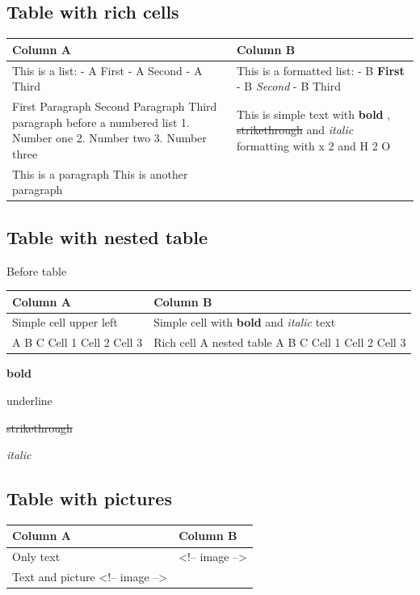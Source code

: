 \documentclass[11pt,a4paper]{article}
\begin{document}
\subsection{Table with rich cells}

\begin{table}[h]
\begin{tabular}{|l|l|}
\hline
Column A & Column B \\ \hline
This is a list:  - A First - A Second - A Third & This is a formatted list:  - B \textbf{First} - B \textit{Second} - B Third \\ \hline
First Paragraph  Second Paragraph  Third paragraph before a numbered list  1. Number one 2. Number two 3. Number three & This is simple text with  \textbf{bold}  ,  \sout{strikethrough}  and  \textit{italic}  formatting with x  2  and H  2  O \\ \hline
This is a paragraph  This is another paragraph &  \\ \hline
\end{tabular}
\end{table}

\subsection{Table with nested table}

Before table

\begin{table}[h]
\begin{tabular}{|l|l|}
\hline
Column A & Column B \\ \hline
Simple cell upper left & Simple cell with  \textbf{bold}  and  \textit{italic}  text \\ \hline
A B C Cell 1 Cell 2 Cell 3 & Rich cell A nested table  A B C Cell 1 Cell 2 Cell 3 \\ \hline
\end{tabular}
\end{table}

\textbf{bold}

underline

\sout{strikethrough}

\textit{italic}

\subsection{Table with pictures}

\begin{table}[h]
\begin{tabular}{|l|l|}
\hline
Column A & Column B \\ \hline
Only text & <!-- image --> \\ \hline
Text and picture  <!-- image --> &  \\ \hline
\end{tabular}
\end{table}
\end{document}
